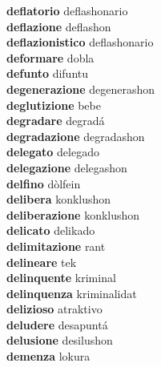 \textbf{deflatorio } deflashonario \\
\textbf{deflazione } deflashon \\
\textbf{deflazionistico } deflashonario \\
\textbf{deformare } dobla \\
\textbf{defunto } difuntu \\
\textbf{degenerazione } degenerashon \\
\textbf{deglutizione } bebe \\
\textbf{degradare } degradá \\
\textbf{degradazione } degradashon \\
\textbf{delegato } delegado \\
\textbf{delegazione } delegashon \\
\textbf{delfino } dòlfein \\
\textbf{delibera } konklushon \\
\textbf{deliberazione } konklushon \\
\textbf{delicato } delikado \\
\textbf{delimitazione } rant \\
\textbf{delineare } tek \\
\textbf{delinquente } kriminal \\
\textbf{delinquenza } kriminalidat \\
\textbf{delizioso } atraktivo \\
\textbf{deludere } desapuntá \\
\textbf{delusione } desilushon \\
\textbf{demenza } lokura \\
